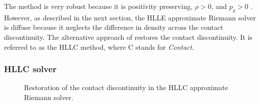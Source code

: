 The method is very robust because it is positivity preserving, $\rho > 0$, and $p_g > 0$ \citep{Einfeldt:1991}.  However, as described in the next section, the HLLE approximate Riemann solver is diffuse because it neglects the difference in density across the contact discontinuity.  The alternative approach of \citet{Toro:1994} restores the contact discontinuity.  It is referred to as the HLLC method, where C stands for \emph{Contact}.  

\subsubsection[HLLC solver]{HLLC solver}
\label{sec:hllc}

\begin{figure}[htbp]
\begin{center}

\end{center}
\caption{Restoration of the contact discontinuity in the HLLC approximate Riemann solver.}
\label{fig:hllc_rstates}
\end{figure}

